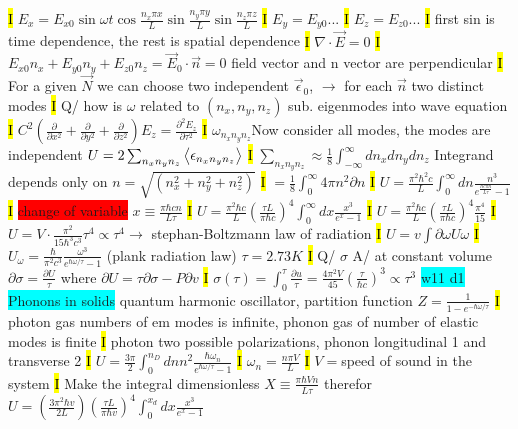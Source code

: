 \documentclass[fontsize=4pt]{scrartcl}
\begin{document}
\hl{I}
$E_x = E_{x0} \sin \omega t \cos \frac{n_x \pi x}{L} \sin \frac{n_y \pi y}{L} \sin \frac{n_z \pi z}{L}$
\hl{I}
$E_y = E_{y0}...$
\hl{I}
$E_z = E_{z0}...$
\hl{I}
first sin is time dependence, the rest is spatial dependence
\hl{I}
$\nabla \cdot  \vec{E} = 0$
\hl{I}
$E_{x0}n_x + E_{y0}n_y + E_{z0}n_z = \vec{E}_0 \cdot \vec{n} = 0$
field vector and n vector are perpendicular 
\hl{I}
For a given $\vec{N}$ we can choose two independent $\vec{\epsilon}_0$,
$\rightarrow$ for each $\vec{n}$ two distinct modes
\hl{I}
Q/ how is $\omega$ related to $(n_x , n_y, n_z)$ sub. eigenmodes into wave equation
\hl{I}
$C^2 (\frac{\partial}{\partial x^2} + \frac{\partial}{\partial y^2} + \frac{\partial}{\partial z^2})E_z = \frac{\partial^2 E_z}{\partial \tau^2}$
\hl{I}
$\omega_{n_xn_yn_z} $Now consider all modes, the modes are independent
$U = 2 \sum_{n_{x} n_{y} n_{z}} \expval{\epsilon_{n_x n_y n_z}} $
\hl{I}
$\sum_{n_x n_y n_z} \approx \frac{1}{8} \int_{-\infty}^{\infty} dn_x dn_y dn_z$ Integrand depends only on $n=\sqrt{(n_x^2 + n_y^2 + n_z^2)}$
\hl{I}
$=\frac{1}{8}\int_{0}^{\infty} 4\pi n^2 \partial n$
\hl{I}
$U = \frac{\pi^2 \hbar^2 c}{L} \int_{0}^{\infty} dn \frac{n^3}{e^{\frac{\hbar c \pi n}{L \tau} }-1 }$
\hl{I}
\colorbox{Red}{change of variable}
$x \equiv \frac{\pi \hbar c n}{L \tau}$
\hl{I}
$U = \frac{\pi^2 \hbar c}{L}(\frac{\tau L}{\pi \hbar c})^4 \int_{0}^{\infty} dx \frac{x^3}{e^x - 1}$
\hl{I}
$U =  \frac{\pi^2 \hbar c}{L}(\frac{\tau L}{\pi \hbar c})^4 \frac{\pi^4}{15}$
\hl{I}
$U = V \cdot \frac{\pi^2}{15 \hbar^3 c^3} \tau^4 \propto \tau^4 \rightarrow$ stephan-Boltzmann law of radiation
\hl{I}
$U = v \int \partial \omega U \omega$
\hl{I}
$U_{\omega} = \frac{\hbar}{\pi^2 c^3} \frac{\omega^3}{e^{\hbar \omega/\tau} -1}$ (plank radiation law) $\tau = 2.73 K$
\hl{I}
Q/ $\sigma$ A/ at constant volume $\partial \sigma = \frac{\partial U}{\tau}$ where $\partial U = \tau \partial \sigma - P \partial v$
\hl{I}
$\sigma(\tau) = \int_0^{\tau} \frac{\partial u}{\tau} = \frac{4\pi^2 V}{45}(\frac{\tau}{\hbar c})^3 \propto \tau^3$
\colorbox{Cyan}{w11 d1 Phonons in solids}
quantum harmonic oscillator, partition function $Z = \frac{1}{1-e^{-\hbar \omega /\tau}}$
\hl{I}
photon gas numbers of em modes is infinite, 
phonon gas of number of elastic modes is finite
\hl{I}
photon two possible polarizations, phonon longitudinal 1 and transverse 2
\hl{I}
$U=\frac{3\pi}{2}\int_{0}^{n_D} dn n^2 \frac{\hbar \omega_n}{e^{\hbar \omega / \tau} -1}$ 
\hl{I}
$\omega_n = \frac{n\pi V}{L}$
\hl{I}
$V = $speed of sound in the system
\hl{I}
Make the integral dimensionless
$X \equiv \frac{\pi \hbar V n}{L \tau}$ therefor $ U = (\frac{3\pi^2 \hbar v}{2L})(\frac{\tau L}{\pi \hbar v})^4 \int_0^{x_d} dx \frac{x^3}{e^x - 1}$
\end{document}
